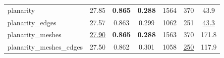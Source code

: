 \begin{table}[t]
{\begin{tabular}{@{}l|cccccc@{}}
planarity & 27.85 & \cellcolor{green!70}\textbf{0.865} & \cellcolor{green!70}\textbf{0.288} & 1564 & 370 & 43.9 \\
planarity\_edges & 27.57 & \cellcolor{green!20}0.863 & \cellcolor{green!20}0.299 & 1062 & \cellcolor{green!20}251 & \cellcolor{green!40}\underline{43.3} \\
planarity\_meshes & \cellcolor{green!40}\underline{27.90} & \cellcolor{green!70}\textbf{0.865} & \cellcolor{green!70}\textbf{0.288} & 1563 & 370 & 171.8 \\
planarity\_meshes\_edges & 27.50 & 0.862 & 0.301 & 1058 & \cellcolor{green!40}\underline{250} & 117.9 \\
\bottomrule
\end{tabular}%
}
\end{table}
